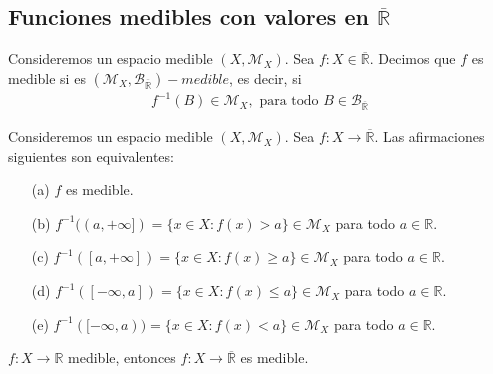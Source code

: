 \subsection{Funciones medibles con valores en $\overline{\mathbb{R}}$}
\begin{defi}
    Consideremos un espacio medible $(X, \mathcal{M}_X)$. Sea $f: X \in \overline{\mathbb{R}}$. Decimos que $f$ es medible si es $(\mathcal{M}_X, \mathcal{B}_{\overline{\mathbb{R}}})-medible$, es decir, si
    \begin{align*}
        f^{-1}(B) \in \mathcal{M}_X, \text{ \ \ \ para todo } B \in \mathcal{B}_{\overline{\mathbb{R}}}
    \end{align*}
\end{defi}

\begin{prop}
    Consideremos un espacio medible $(X, \mathcal{M}_X)$. Sea $f: X \longrightarrow \overline{\mathbb{R}}$. Las afirmaciones siguientes son equivalentes:
    \begin{enumerate}
        \item[(a)] $f$ es medible.
        \item[(b)] $f^{-1}((a,+\infty]) = \{ x \in X : f(x) > a\} \in \mathcal{M}_X$ para todo $a \in \mathbb{R}$.
        \item[(c)] $f^{-1}([a,+\infty]) = \{ x \in X : f(x) \ge a\} \in \mathcal{M}_X$ para todo $a \in \mathbb{R}$.
        \item[(d)] $f^{-1}([-\infty,a]) = \{ x \in X : f(x) \leq a\} \in \mathcal{M}_X$ para todo $a \in \mathbb{R}$.
        \item[(e)] $f^{-1}([-\infty,a)) = \{ x \in X : f(x) < a\} \in \mathcal{M}_X$ para todo $a \in \mathbb{R}$.
    \end{enumerate}
\end{prop}
\begin{obs}
    $f: X \longrightarrow \mathbb{R}$ medible, entonces $f: X \longrightarrow \overline{\mathbb{R}}$ es medible.
\end{obs}
